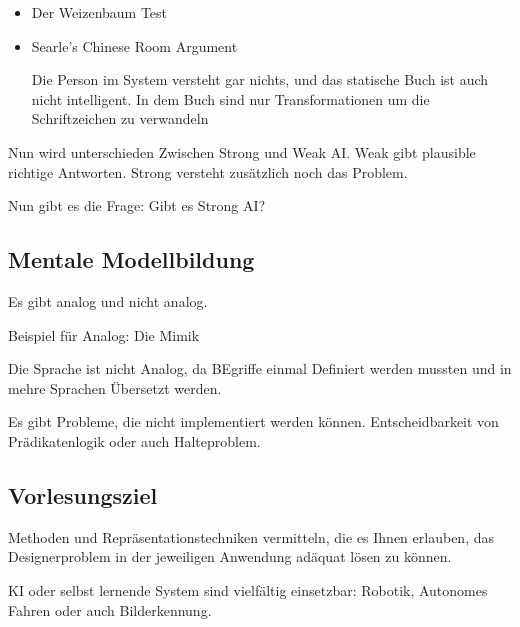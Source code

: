 \documentclass[a4paper]{article}
\begin{document}
\begin{itemize}
    \item Der Weizenbaum Test
    \item Searle's Chinese Room Argument
    
    Die Person im System versteht gar nichts, und das statische Buch ist auch nicht intelligent. In dem Buch sind nur Transformationen um die Schriftzeichen zu verwandeln
\end{itemize}

Nun wird unterschieden Zwischen Strong und Weak AI. Weak gibt plausible richtige Antworten. Strong versteht zusätzlich noch das Problem.

Nun gibt es die Frage: Gibt es Strong AI?

\subsection{Mentale Modellbildung}

Es gibt analog und nicht analog. 

Beispiel für Analog: Die Mimik

Die Sprache ist nicht Analog, da BEgriffe einmal Definiert werden mussten und in mehre Sprachen Übersetzt werden.

Es gibt Probleme, die nicht implementiert werden können. Entscheidbarkeit von Prädikatenlogik oder auch Halteproblem.

\subsection{Vorlesungsziel}

Methoden und Repräsentationstechniken vermitteln, die es Ihnen erlauben, das Designerproblem in der jeweiligen Anwendung adäquat lösen zu können.


KI oder selbst lernende System sind vielfältig einsetzbar: Robotik, Autonomes Fahren oder auch Bilderkennung.
\end{document}
